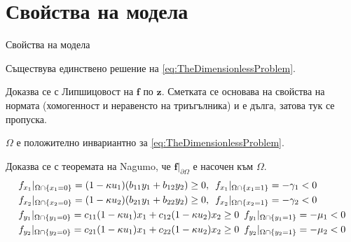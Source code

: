 \section{\hspace{1em}Свойства на модела}


\begin{frame}[t]{Свойства на модела}
  \begin{proposition}
    Съществува единствено решение на \eqref{eq:TheDimensionlessProblem}.
  \end{proposition}

  Доказва се с Липшицовост на $\boldsymbol{f}$ по $\boldsymbol{z}$.
  Сметката се основава на свойства на нормата (хомогенност и неравенсто на триъгълника) и  е дълга, затова тук се пропуска.

  \begin{proposition}
    $\Omega$ е положително инвариантно за \eqref{eq:TheDimensionlessProblem}.
  \end{proposition}

  Доказва се с теоремата на Nagumo, че $\boldsymbol{f} \vert_{\partial \Omega}$ е насочен към $\Omega$.
  \begin{equation*}
    \begin{split}
      &f_{x_1}\vert_{\Omega \cap \{x_1=0\}} = (1-\kappa u_1)(b_{11} y_1 + b_{12} y_2) \geq 0, \hspace{0.5em} f_{x_1}\vert_{\Omega \cap \{x_1=1\}} = - \gamma_1 < 0 \\
      &f_{x_2}\vert_{\Omega \cap \{x_2=0\}} = (1-\kappa u_2)(b_{21} y_1 + b_{22} y_2) \geq 0, \hspace{0.5em} f_{x_2}\vert_{\Omega \cap \{x_2=1\}} = - \gamma_2 < 0 \\
      &f_{y_1}\vert_{\Omega \cap \{y_1=0\}} = c_{11}(1-\kappa u_1) x_1 + c_{12}(1-\kappa u_2) x_2 \geq 0 \hspace{0.5em} f_{y_1}\vert_{\Omega \cap \{y_1=1\}} = - \mu_1 < 0 \\
      &f_{y_2}\vert_{\Omega \cap \{y_2=0\}} = c_{21}(1-\kappa u_1) x_1 + c_{22}(1-\kappa u_2) x_2 \geq 0 \hspace{0.5em} f_{y_2}\vert_{\Omega \cap \{y_2=1\}} = - \mu_2 < 0
    \end{split}
  \end{equation*}
\end{frame}

